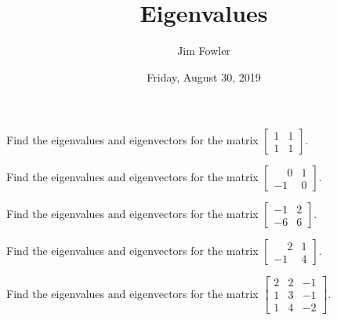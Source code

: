 \documentclass{homework}
\author{Jim Fowler}
\title{Eigenvalues}
\date{Friday, August 30, 2019}
\begin{document}
\maketitle

\begin{problem}
  Find the eigenvalues and eigenvectors for the matrix $\begin{bmatrix} 1 & 1 \\ 1 & 1 \end{bmatrix}$.
\end{problem}

\vfill

\begin{problem}
  Find the eigenvalues and eigenvectors for the matrix $\begin{bmatrix} \phantom{-}0 & 1 \\ -1 & 0 \end{bmatrix}$.
\end{problem}

\vfill

\begin{problem}
  Find the eigenvalues and eigenvectors for the matrix $\begin{bmatrix} -1 & 2 \\ -6 & 6 \end{bmatrix}$.
\end{problem}

\vfill

\begin{problem}
    Find the eigenvalues and eigenvectors for the matrix $\begin{bmatrix} \phantom{-}2 & 1 \\ -1 & 4 \end{bmatrix}$.
\end{problem}

\vfill

\begin{problem}
    Find the eigenvalues and eigenvectors for the matrix $\begin{bmatrix}
2 & 2 & -1 \\
1 & 3 & -1 \\
1 & 4 & -2
\end{bmatrix}$.
\end{problem}
\end{document}
